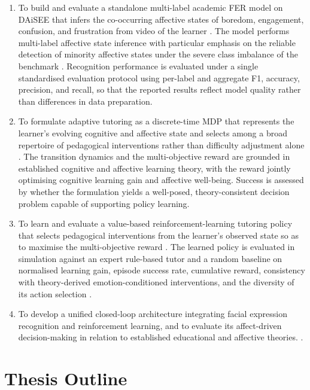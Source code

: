 \begin{enumerate}
  \item To build and evaluate a standalone multi-label academic \ac{FER} model on \ac{DAiSEE} that infers the co-occurring affective states of boredom, engagement, confusion, and frustration from video of the learner \cite{gupta_daisee_2016,mehta_three-dimensional_2022}. The model performs multi-label affective state inference with particular emphasis on the reliable detection of minority affective states under the severe class imbalance of the benchmark \cite{aly_comprehensive_2025}. Recognition performance is evaluated under a single standardised evaluation protocol using per-label and aggregate F1, accuracy, precision, and recall, so that the reported results reflect model quality rather than differences in data preparation.
  \item To formulate adaptive tutoring as a discrete-time \ac{MDP} that represents the learner's evolving cognitive and affective state and selects among a broad repertoire of pedagogical interventions rather than difficulty adjustment alone \cite{axak_adaptive_2025,azoulay_adaptive_2021}. The transition dynamics and the multi-objective reward are grounded in established cognitive and affective learning theory, with the reward jointly optimising cognitive learning gain and affective well-being. Success is assessed by whether the formulation yields a well-posed, theory-consistent decision problem capable of supporting policy learning.
  \item To learn and evaluate a value-based reinforcement-learning tutoring policy that selects pedagogical interventions from the learner's observed state so as to maximise the multi-objective reward \cite{mnih_dqn_2015}. The learned policy is evaluated in simulation against an expert rule-based tutor and a random baseline on normalised learning gain, episode success rate, cumulative reward, consistency with theory-derived emotion-conditioned interventions, and the diversity of its action selection \cite{fernandez-herrero_evaluating_2024,yuvaraj_affective_2025,lek_academic_2023}.
    \item To develop a unified closed-loop architecture integrating facial expression recognition and reinforcement learning, and to evaluate its affect-driven decision-making in relation to established educational and affective theories. \cite{yuvaraj_affective_2025}.
\end{enumerate}
\section{Thesis Outline}\label{sec:outline}

